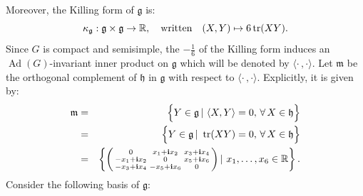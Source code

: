 \documentclass[preprint,12pt,1p]{elsarticle}
\theoremstyle{plain}
\theoremstyle{definition}
\newcommand{\met}{\langle\cdot\,,\cdot\rangle}
\newcommand{\tr}{\operatorname{tr}}
\newcommand{\h}{\mathfrak{h}}
\newcommand{\Ad}{\operatorname{Ad}}
\numberwithin{equation}{section}
\begin{document}
Moreover, the Killing form of $\mathfrak{g}$ is:
\begin{equation*}
\kappa_\mathfrak{g}:\mathfrak{g}\times\mathfrak{g}\to{\mathbb{R}},\quad\textnormal{written}\quad (X,Y)\mapsto 6\tr(XY).
\end{equation*}
Since $G$ is compact and semisimple, the $-\frac{1}{6}$ of the Killing form induces an $\Ad(G)$-invariant inner product on $\mathfrak{g}$ which will be denoted by $\met$. Let $\mathfrak{m}$ be the orthogonal complement of $\mathfrak{h}$ in $\mathfrak{g}$ with respect to $\met$. Explicitly, it is given by:
\begin{eqnarray*}
\mathfrak{m}&=&\Big\{Y\in\mathfrak{g}\,|\,\,\langle X,Y\rangle =0,\,\forall\,X\in\h\Big\}\\
&=&\Big\{Y\in\mathfrak{g}\,|\,\,\tr(XY)=0,\,\forall\,X\in\h\Big\}\\
&=&\left\{\begin{psmallmatrix}
0&x_1+\mathbf{i}x_2&x_3+\mathbf{i}x_4\\
-x_1+\mathbf{i}x_2&0&x_5+\mathbf{i}x_6\\
-x_3+\mathbf{i}x_4&-x_5+\mathbf{i}x_6&0
\end{psmallmatrix}\,|\,\,x_1,\ldots,x_6\in{\mathbb{R}}\right\}.
\end{eqnarray*}
Consider the following basis of $\mathfrak{g}$:
\end{document}
